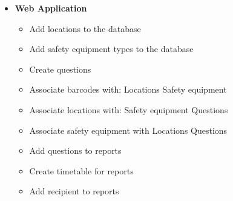 \documentclass[Letter,11pt]{article}
\begin{document}
	\begin{minipage}[t]{0.5\textwidth}
		\begin{itemize}
			\item \textbf{Web Application}
				\begin{itemize}
					\item Add locations to the database
					\item Add safety equipment types to the database
					\item Create questions
					\item Associate barcodes with:
						\subitem Locations
						\subitem Safety equipment
					\item Associate locations with:
						\subitem Safety equipment
						\subitem Questions
					\item Associate safety equipment with
						\subitem Locations
						\subitem Questions
					\item Add questions to reports
					\item Create timetable for reports
					\item Add recipient to reports
				\end{itemize}
		\end{itemize}
	\end{minipage}
		
\end{document}
